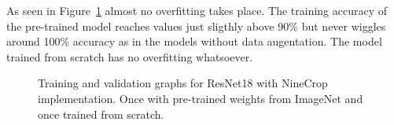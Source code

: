 \begin{table}[!h] \centering
{}
\caption{Resnet18 NineCrop implementation with and without pre-training. FINAL (regular) means ResNet18 with the resizing of the image instead of cropping and averaging}
\label{tbl:resnet18-randomnine}
\end{table}

\newpage

As seen in Figure~\ref{fig:resnet18-ninecrop-graph} almost no overfitting takes place. The  training accuracy of the pre-trained model reaches values just sligthly above  90\%  but never wiggles around 100\% accuracy as in the models without data augentation. The model trained from scratch has no overfitting whatsoever.

\begin{figure}[!h]
\centering
\caption{Training and validation graphs for ResNet18 with NineCrop implementation. Once with pre-trained weights from ImageNet and once trained from scratch.}
\label{fig:resnet18-ninecrop-graph}
\end{figure}

